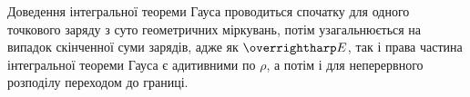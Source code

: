 \documentclass[12pt]{article} %
\begin{document}
Доведення інтегральної теореми Гауса проводиться спочатку для одного точкового заряду з суто геометричних міркувань, потім узагальнюється на
випадок скінченної суми зарядів, адже як $\myvec{E}$, так і права частина інтегральної теореми Гауса є адитивними по $\rho$, а потім
і для неперервного розподілу переходом до границі.
\end{document}
